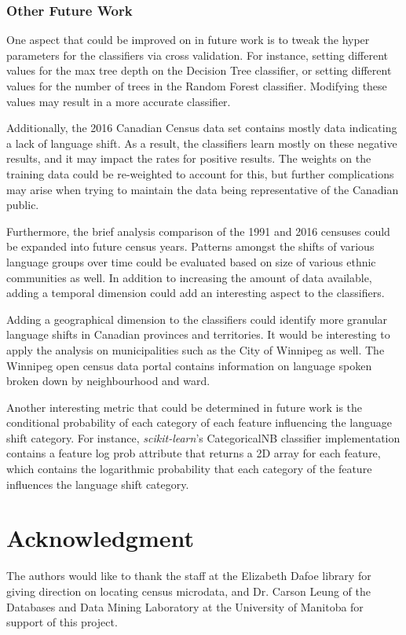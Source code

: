 \documentclass[10pt, conference, compsocconf]{IEEEtran}
\begin{document}
\subsubsection{Other Future Work}

One aspect that could be improved on in future work is to tweak the hyper parameters for the classifiers via cross validation. For instance, setting different values for the max tree depth on the Decision Tree classifier, or setting different values for the number of trees in the Random Forest classifier. Modifying these values may result in a more accurate classifier.

Additionally, the 2016 Canadian Census data set contains mostly data indicating a lack of language shift. As a result, the classifiers learn mostly on these negative results, and it may impact the rates for positive results. The weights on the training data could be re-weighted to account for this, but further complications may arise when trying to maintain the data being representative of the Canadian public.

Furthermore, the brief analysis comparison of the 1991 and 2016 censuses could be expanded into future census years. Patterns amongst the shifts of various language groups over time could be evaluated based on size of various ethnic communities as well. In addition to increasing the amount of data available, adding a temporal dimension could add an interesting aspect to the classifiers.

Adding a geographical dimension to the classifiers could identify more granular language shifts in Canadian provinces and territories. It would be interesting to apply the analysis on municipalities such as the City of Winnipeg as well. The Winnipeg open census data portal contains information on language spoken broken down by neighbourhood and ward.

Another interesting metric that could be determined in future work is the conditional probability of each category of each feature influencing the language shift category. For instance, \textit{scikit-learn}'s CategoricalNB classifier implementation contains a feature log prob attribute that returns a 2D array for each feature, which contains the logarithmic probability that each category of the feature influences the language shift category.

\section*{Acknowledgment}


The authors would like to thank the staff at the Elizabeth Dafoe library for giving direction on locating census microdata, and Dr. Carson Leung of the Databases and Data Mining Laboratory at the University of Manitoba for support of this project.



\end{document}

